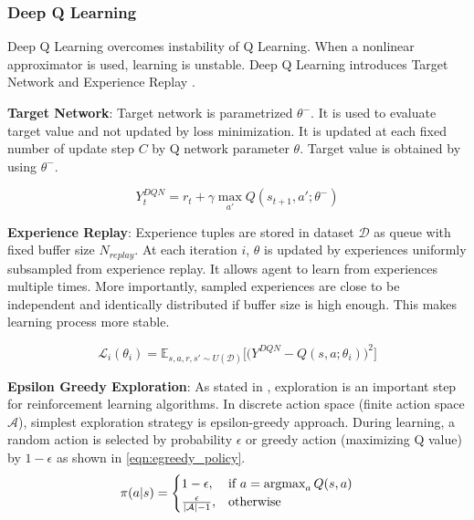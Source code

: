 \subsubsection{Deep Q Learning}

Deep Q Learning overcomes instability of Q Learning. When a nonlinear approximator is used, learning is unstable. Deep Q Learning introduces Target Network and Experience Replay \cite{mnih_human-level_2015}.

\textbf{Target Network}: Target network is parametrized $\theta^-$. It is used to evaluate target value and not updated by loss minimization. It is updated at each fixed number of update step $C$ by Q network parameter $\theta$. Target value is obtained by using $\theta^-$.

\begin{equation}
\label{eqn:dqn_ntarget}
Y_t^{DQN} = r_t + \gamma \max_{a'} Q(s_{t+1},a';\theta^-)
\end{equation}

\textbf{Experience Replay}: Experience tuples are stored in dataset $\mathcal{D}$ as queue with fixed buffer size $N_{replay}$. At each iteration $i$, $\theta$ is updated by experiences uniformly subsampled from experience replay. It allows agent to learn from experiences multiple times. More importantly, sampled experiences are close to be independent and identically distributed if buffer size is high enough. This makes learning process more stable.  

\begin{equation}
\label{eqn:dqn_loss}
\mathcal{L}_i(\theta_i) = \mathbb{E}_{s,a,r,s'\sim U(\mathcal{D})}\Big[\big( Y^{DQN} - Q(s,a;\theta_i) \big) ^ 2 \Big]
\end{equation}

\textbf{Epsilon Greedy Exploration}: As stated in , exploration is an important step for reinforcement learning algorithms. In discrete action space (finite action space $\mathcal{A}$), simplest exploration strategy is epsilon-greedy approach. During learning, a random action is selected by probability $\epsilon$ or greedy action (maximizing Q value) by $1-\epsilon$ as shown in \eqref{eqn:egreedy_policy}. 
%
\begin{equation}
\label{eqn:egreedy_policy}
\pi(a|s) = 
\begin{cases}
1-\epsilon,   & \text{if } a = \operatorname{\textup{argmax}}_{a} Q(s, a)\\
\frac{\epsilon}{|\mathcal{A}|-1},     & \text{otherwise}
\end{cases} 
\end{equation}


